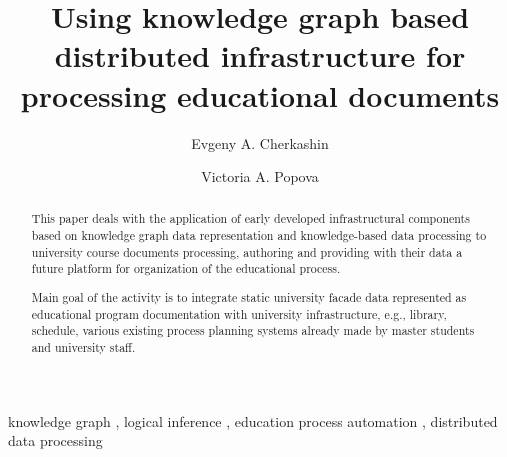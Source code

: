 \documentclass[
]{ceurart}
\newcommand{\email}[1]{\texttt{#1}}
\begin{document}


\title{Using knowledge graph based distributed infrastructure for processing educational documents}

\author[1,2]{Evgeny A. Cherkashin}
\author[2]{Victoria A. Popova}
\address[1]{Matrosov Institute for System Dynamics and Control Theory SB RAS, Irkutsk, Russia}
\address[2]{Institute of Mathematics and Information Technologies, Irkutsk State University, Irkutsk, Russia\\[0.7em]
\email{eugeneai@icc.ru};\quad\email{victorypopova1@gmail.com}}


\begin{abstract}
  This paper deals with the application of early developed infrastructural components based on knowledge graph data representation and knowledge-based data processing to university course documents processing, authoring and providing with their data a future platform for organization of the educational process.  
  
  Main goal of the activity is to integrate static university facade data represented as educational program documentation with university infrastructure, e.g., library, schedule, various existing process planning systems already made by master students and university staff.
\end{abstract}

\begin{keywords}
  knowledge graph \sep
  logical inference \sep
  education process automation \sep
  distributed data processing
\end{keywords}
\end{document}

